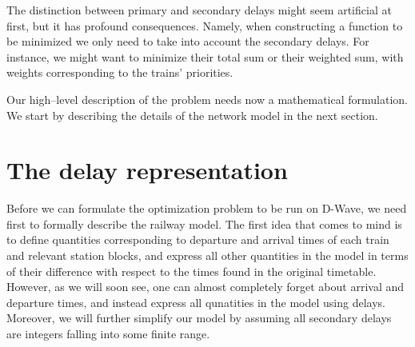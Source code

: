 The distinction between primary and secondary delays might seem
artificial at first, but it has profound consequences. Namely, when constructing a function to
be minimized we only need to take into account the secondary delays. For instance, we might
want to minimize their total sum or their weighted sum, with weights corresponding to the trains'
priorities.

Our high--level description of the problem needs now a mathematical formulation. We start by
describing the details of the network model in the next section.

\section{The delay representation}
Before we can formulate the optimization problem to be run on D-Wave, we need first to
formally describe the railway model. The first idea that comes to mind is to define
quantities corresponding to departure and arrival times of each train and relevant
station blocks, and express all other quantities in the model in terms of their
difference with respect to the times found in the original timetable. However, as we
will soon see, one can almost completely forget about arrival and departure times,
and instead express all qunatities in the model using delays. Moreover, we will
further simplify our model by assuming all secondary delays are integers falling into
some finite range.

